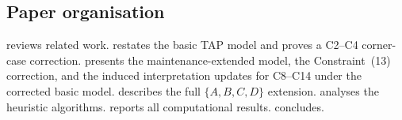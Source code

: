 \subsection*{Paper organisation}

 reviews related work.   restates the
basic TAP model and proves a C2--C4 corner-case correction.  
presents the maintenance-extended model, the Constraint~(13) correction, and
the induced interpretation updates for C8--C14 under the corrected basic model.
 describes the
full $\{A,B,C,D\}$ extension.   analyses the heuristic
algorithms.   reports all computational results.
 concludes.
